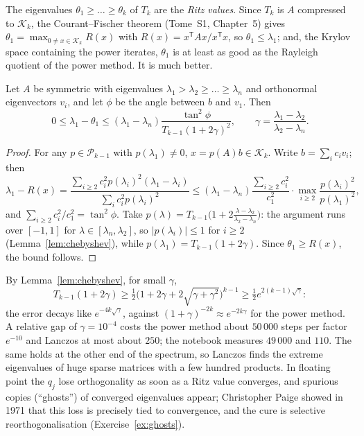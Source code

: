 The eigenvalues $\theta_1\ge\dots\ge\theta_k$ of $T_k$ are the \emph{Ritz values}. Since $T_k$ is $A$ compressed to $\mathcal K_k$, the Courant--Fischer
theorem (Tome~S1, Chapter~5) gives $\theta_1=\max_{0\ne x\in\mathcal K_k}R(x)$ with $R(x)=x^{\mathsf T}Ax/x^{\mathsf T}x$, so $\theta_1\le\lambda_1$; and, the
Krylov space containing the power iterates, $\theta_1$ is at least as good as the Rayleigh quotient of the power method. It is much better.

\begin{theorem}\label{thm:kaniel}
Let $A$ be symmetric with eigenvalues $\lambda_1>\lambda_2\ge\dots\ge\lambda_n$ and orthonormal eigenvectors $v_i$, and let $\phi$ be the angle between $b$ and $v_1$. Then
\[
0\le\lambda_1-\theta_1\le(\lambda_1-\lambda_n)\frac{\tan^2\phi}{T_{k-1}(1+2\gamma)^2},\qquad\gamma=\frac{\lambda_1-\lambda_2}{\lambda_2-\lambda_n}.
\]
\end{theorem}
\begin{proof}
For any $p\in\mathcal P_{k-1}$ with $p(\lambda_1)\ne0$, $x=p(A)b\in\mathcal K_k$. Write $b=\sum_ic_iv_i$; then
\[
\lambda_1-R(x)=\frac{\sum_{i\ge2}c_i^2p(\lambda_i)^2(\lambda_1-\lambda_i)}{\sum_ic_i^2p(\lambda_i)^2}\le(\lambda_1-\lambda_n)\frac{\sum_{i\ge2}c_i^2}{c_1^2}\cdot\max_{i\ge2}\frac{p(\lambda_i)^2}{p(\lambda_1)^2},
\]
and $\sum_{i\ge2}c_i^2/c_1^2=\tan^2\phi$. Take $p(\lambda)=T_{k-1}\bigl(1+2\frac{\lambda-\lambda_2}{\lambda_2-\lambda_n}\bigr)$: the argument runs over $[-1,1]$ for $\lambda\in[\lambda_n,\lambda_2]$,
so $|p(\lambda_i)|\le1$ for $i\ge2$ (Lemma~\ref{lem:chebyshev}), while $p(\lambda_1)=T_{k-1}(1+2\gamma)$. Since $\theta_1\ge R(x)$, the bound follows.
\end{proof}

By Lemma~\ref{lem:chebyshev}, for small $\gamma$,
\[
T_{k-1}(1+2\gamma)\ge\tfrac12\bigl(1+2\gamma+2\sqrt{\gamma+\gamma^2}\bigr)^{k-1}\ge\tfrac12e^{2(k-1)\sqrt\gamma}:
\]
the error decays like $e^{-4k\sqrt\gamma}$,
against $(1+\gamma)^{-2k}\approx e^{-2k\gamma}$ for the power method. A relative gap of $\gamma=10^{-4}$ costs the power method about $50\,000$ steps per factor $e^{-10}$ and Lanczos
at most about $250$; the notebook measures $49\,000$ and $110$. The same holds at the other end of the spectrum, so Lanczos finds the extreme eigenvalues of huge sparse matrices with a few hundred products.
In floating point the $q_j$ lose orthogonality as soon as a Ritz value converges, and spurious copies (``ghosts'') of converged eigenvalues appear;
Christopher Paige showed in 1971 that this loss is precisely tied to convergence, and the cure is selective reorthogonalisation (Exercise~\ref{ex:ghosts}).

